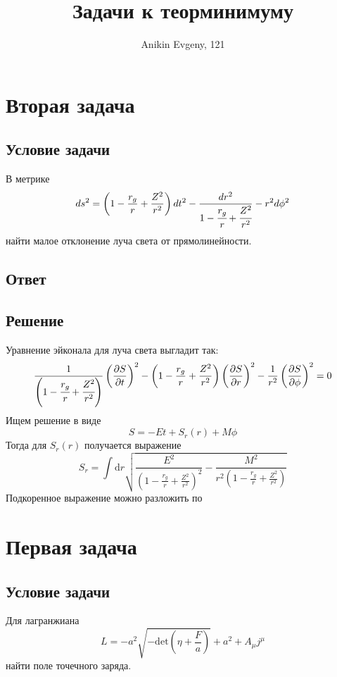 \documentclass{article}
\title{Задачи к теорминимуму}
\author{Anikin Evgeny, 121}
\begin{document}
\maketitle
\section{Вторая задача}
\subsection{Условие задачи}
В метрике
\begin{equation}
ds^2 = \left(1 - \frac{r_g}{r} + \frac{Z^2}{r^2}\right)dt^2
	- \frac{dr^2}{1 - \cfrac{r_g}{r} + \cfrac{Z^2}{r^2}}
	- r^2 d\phi^2
\end{equation}
найти малое отклонение луча света от прямолинейности.
\subsection{Ответ}

\subsection{Решение}
Уравнение эйконала для луча света выгладит так:
\begin{equation}
\frac{1}{\left(1 - \cfrac{r_g}{r} + \cfrac{Z^2}{r^2}\right)}
			\left(\frac{\partial S}{\partial t}\right)^2 -
\left(1 - \frac{r_g}{r} + \frac{Z^2}{r^2}\right)
			\left(\frac{\partial S}{\partial r}\right)^2
- \frac{1}{r^2} 
			\left(\frac{\partial S}{\partial \phi}\right)^2 = 0
\end{equation}
Ищем решение в виде 
\begin{equation}
	S = -Et + S_r(r) + M\phi
\end{equation}
Тогда для $S_r(r)$ получается выражение
\begin{equation}
S_r = \int \mathrm{d} r\sqrt{
		\frac{E^2}{\left( 1 - \frac{r_g}{r} + \frac{Z^2}{r^2} \right)^2} - 
		\frac{M^2}{r^2 \left( 1 - \frac{r_g}{r} + \frac{Z^2}{r^2}\right)}
		}	
\end{equation}
Подкоренное выражение можно разложить по 
\section{Первая задача}
\subsection{Условие задачи}
Для лагранжиана
\begin{equation}
	\label{lagr}
	L = -a^2\sqrt{-\mathrm{det}\left(\eta + \frac{F}{a}\right)} + a^2 + A_\mu j^\mu
\end{equation}
найти поле точечного заряда.
\end{document}
